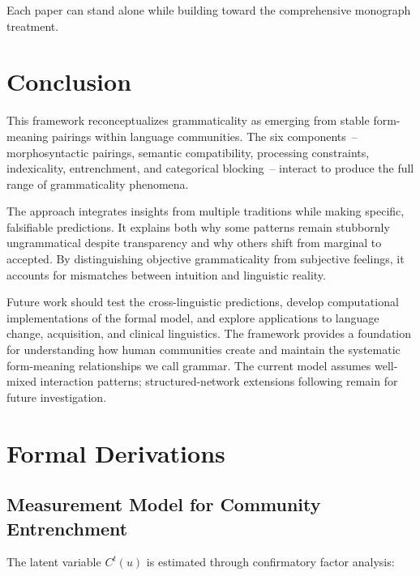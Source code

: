 \documentclass[12pt]{article}
\begin{document}
Each paper can stand alone while building toward the comprehensive monograph treatment.

\section{Conclusion}

This framework reconceptualizes grammaticality as emerging from stable form-meaning pairings within language communities. The six components~-- morphosyntactic pairings, semantic compatibility, processing constraints, indexicality, entrenchment, and categorical blocking~-- interact to produce the full range of grammaticality phenomena.

The approach integrates insights from multiple traditions while making specific, falsifiable predictions. It explains both why some patterns remain stubbornly ungrammatical despite transparency and why others shift from marginal to accepted. By distinguishing objective grammaticality from subjective feelings, it accounts for mismatches between intuition and linguistic reality.

Future work should test the cross-linguistic predictions, develop computational implementations of the formal model, and explore applications to language change, acquisition, and clinical linguistics. The framework provides a foundation for understanding how human communities create and maintain the systematic form-meaning relationships we call grammar. The current model assumes well-mixed interaction patterns; structured-network extensions following \textcite{baxter2006} remain for future investigation.

\newpage
\appendix

\section{Formal Derivations}

\subsection{Measurement Model for Community Entrenchment}

The latent variable $C^t(u)$ is estimated through confirmatory factor analysis:
\end{document}
